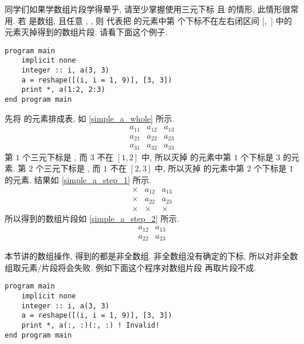 同学们如果学数组片段学得晕乎, 请至少掌握使用三元下标  且  的情形, 此情形很常用. 若  是数组, 且任意 , , 则  代表把  的元素中第  个下标不在左右闭区间 $[$$,$ $]$ 中的元素灭掉得到的数组片段. 请看下面这个例子.
\begin{lstlisting}
program main
    implicit none
    integer :: i, a(3, 3)
    a = reshape([(i, i = 1, 9)], [3, 3])
    print *, a(1:2, 2:3)
end program main
\end{lstlisting}
先将  的元素排成表, 如 \eqref{simple_a_whole} 所示.
\begin{equation}
    \begin{matrix}
        a_{11}&a_{12}&a_{13}\\
        a_{21}&a_{22}&a_{23}\\
        a_{31}&a_{32}&a_{33}
    \end{matrix}\label{simple_a_whole}
\end{equation}
第 $1$ 个三元下标是 , 而 $3$ 不在 $[1,2]$ 中, 所以灭掉  的元素中第 $1$ 个下标是 $3$ 的元素. 第 $2$ 个三元下标是 , 而 $1$ 不在 $[2,3]$ 中, 所以灭掉  的元素中第 $2$ 个下标是 $1$ 的元素. 结果如 \eqref{simple_a_step_1} 所示.
\begin{equation}
    \begin{matrix}
        \times&a_{12}&a_{13}\\
        \times&a_{22}&a_{23}\\
        \times&\times&\times
    \end{matrix}\label{simple_a_step_1}
\end{equation}
所以得到的数组片段如 \eqref{simple_a_step_2} 所示.
\begin{equation}
    \begin{matrix}
        a_{12}&a_{13}\\
        a_{22}&a_{23}
    \end{matrix}\label{simple_a_step_2}
\end{equation}

本节讲的数组操作, 得到的都是非全数组. 非全数组没有确定的下标, 所以对非全数组取元素/片段将会失败. 例如下面这个程序对数组片段  再取片段不成.
\begin{lstlisting}
program main
    implicit none
    integer :: i, a(3, 3)
    a = reshape([(i, i = 1, 9)], [3, 3])
    print *, a(:, :)(:, :) ! Invalid!
end program main
\end{lstlisting}


